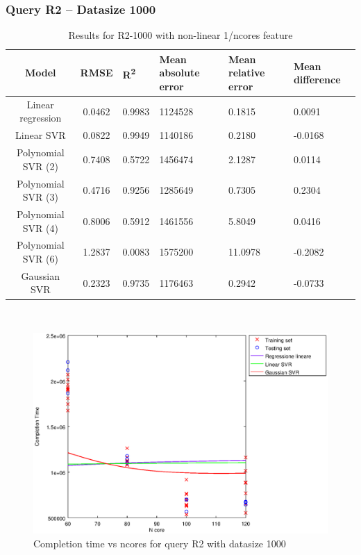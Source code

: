 \documentclass[a4paper,11pt]{article}
\begin{document}
\newpage
\subsubsection{Query R2 -- Datasize 1000}
\begin{table}[H]
	\centering
	\begin{adjustbox}{center}
		\begin{tabular}{c | c M{1.2cm} M{2.5cm} M{2.5cm} M{1.8cm}}
			Model & RMSE & R\textsuperscript{2} & Mean absolute error & Mean relative error & Mean difference \tabularnewline
			\hline
			Linear regression & 0.0462 & 0.9983 & 1124528 & 0.1815 & 0.0091 \\
			Linear SVR & 0.0822 & 0.9949 & 1140186 & 0.2180 & -0.0168 \\
			Polynomial SVR (2) & 0.7408 & 0.5722 & 1456474 & 2.1287 & 0.0114 \\
			Polynomial SVR (3) & 0.4716 & 0.9256 & 1285649 & 0.7305 & 0.2304 \\
			Polynomial SVR (4) & 0.8006 & 0.5912 & 1461556 & 5.8049 & 0.0416 \\
			Polynomial SVR (6) & 1.2837 & 0.0083 & 1575200 & 11.0978 & -0.2082 \\
			Gaussian SVR & 0.2323 & 0.9735 & 1176463 & 0.2942 & -0.0733 \\
		\end{tabular}
	\end{adjustbox}
	\\
	\caption{Results for R2-1000 with non-linear 1/ncores feature}
	\label{table_R2_prediction_all}
\end{table}

\begin {figure}[hbtp]
\centering
\includegraphics[width=\textwidth]{output/R2_1000_1_OVER_NCORES/plot_R2_1000_bestmodels.eps}
\caption {Completion time vs ncores for query R2 with datasize 1000}
\end {figure}
\end{document}
